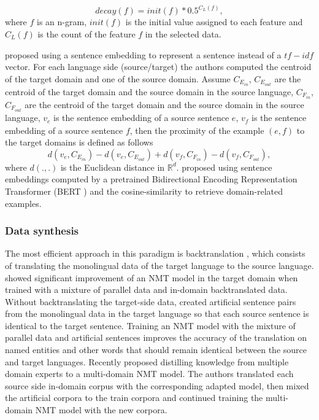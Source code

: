 \begin{equation}
decay(f) = init(f) * 0.5 ^{C_{L}(f)},
\end{equation}
where $f$ is an n-gram, $init(f)$ is the initial value assigned to each feature and $C_{L}(f)$ is the count of the feature $f$ in the selected data.

\citet{Wang17sentence} proposed using a sentence embedding to represent a sentence instead of a $tf-idf$ vector. For each language side (source/target) the authors computed the centroid of the target domain and one of the source domain. Assume $C_{E_{in}}$, $C_{E_{out}}$ are the centroid of the target domain and the source domain in the source language,  $C_{F_{in}}$, $C_{F_{out}}$ are the centroid of the target domain and the source domain in the source language, $v_{\mathit{e}}$ is the sentence embedding of a source sentence $\mathit{e}$, $v_{\mathit{f}}$ is the sentence embedding of a source sentence $\mathit{f}$, then the proximity of the example $(\mathit{e},\mathit{f})$ to the target domains is defined as follows
\begin{equation}
d(v_{\mathit{e}}, C_{E_{in}}) - d(v_{\mathit{e}}, C_{E_{out}}) + d(v_{\mathit{f}}, C_{F_{in}}) - d(v_{\mathit{f}}, C_{F_{out}}),
\end{equation} 
where $d(.,.)$ is the Euclidean distance in $\mathbb{R}^d$. \citet{Aharoni20unsupervised} proposed using sentence embeddings computed by a pretrained Bidirectional Encoding Representation Transformer (BERT ) and the cosine-similarity to retrieve domain-related examples.

\subsubsection{Data synthesis}
The most efficient approach in this paradigm is backtranslation \citep{Sennrich16improving}, which consists of translating the monolingual data of the target language to the source language. \citet{Burlot18using} showed significant improvement of an NMT model in the target domain when trained with a mixture of parallel data and in-domain backtranslated data. Without backtranslating the target-side data, \citet{Currey17copied} created artificial sentence pairs from the monolingual data in the target language so that each source sentence is identical to the target sentence. Training an NMT model with the mixture of parallel data and artificial sentences improves the accuracy of the translation on named entities and other words that should remain identical between the source and target languages. Recently \citet{currey20distilling} proposed distilling knowledge from multiple domain experts to a multi-domain NMT model. The authors translated each source side in-domain corpus with the corresponding adapted model, then mixed the artificial corpora to the train corpora and continued training the multi-domain NMT model with the new corpora.

